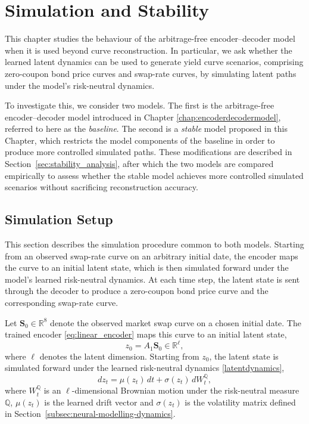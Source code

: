 \chapter{Simulation and Stability}
\label{chap:simulation}

This chapter studies the behaviour of the arbitrage-free encoder--decoder model when it is used beyond curve reconstruction. In particular, we ask whether the learned latent dynamics can be used to generate yield curve scenarios, comprising zero-coupon bond price curves and swap-rate curves, by simulating latent paths under the model's risk-neutral dynamics.

To investigate this, we consider two models. The first is the arbitrage-free encoder--decoder model introduced in Chapter \ref{chap:encoderdecodermodel}, referred to here as the \textit{baseline}. The second is a \textit{stable} model proposed in this Chapter, which restricts the model components of the baseline in order to produce more controlled simulated paths. These modifications are described in Section~\ref{sec:stability_analysis}, after which the two models are compared empirically to assess whether the stable model achieves more controlled simulated scenarios without sacrificing reconstruction accuracy.


\section{Simulation Setup}
\label{sec:simulation-latent-dynamics}

This section describes the simulation procedure common to both models. Starting from an observed swap-rate curve on an arbitrary initial date, the encoder maps the curve to an initial latent state, which is then simulated forward under the model's learned risk-neutral dynamics. At each time step, the latent state is sent through the decoder to produce a zero-coupon bond price curve and the corresponding swap-rate curve.

Let \(\mathbf{S}_0 \in \mathbb{R}^8\) denote the observed market swap curve on a chosen initial date. The trained encoder \eqref{eq:linear_encoder} maps this curve to an initial latent state,
\[
z_0 = A_1\mathbf{S}_0 \in \mathbb{R}^{\ell},
\]
where \(\ell\) denotes the latent dimension. Starting from \(z_0\), the latent state is simulated forward under the learned risk-neutral dynamics \eqref{latentdynamics},
\[
dz_t = \mu(z_t)\,dt + \sigma(z_t)\,dW_t^{\mathbb{Q}},
\]
where \(W_t^{\mathbb{Q}}\) is an \(\ell\)-dimensional Brownian motion under the risk-neutral measure \(\mathbb{Q}\), \(\mu(z_t)\) is the learned drift vector and \(\sigma(z_t)\) is the volatility matrix defined in Section~\ref{subsec:neural-modelling-dynamics}.

